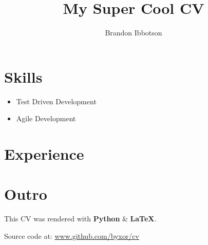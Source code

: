 \documentclass{article}
\author{Brandon Ibbotson}
\title{My Super Cool CV}
\begin{document}
\maketitle
\section{Skills}
\begin{itemize}
 \item Test Driven Development
 \item Agile Development
\end{itemize}
\section{Experience}
\section{Outro}
This CV was rendered with \textbf{Python} {\&} \textbf{{\LaTeX}}.

Source code at: \url{www.github.com/byxor/cv}
\end{document}
